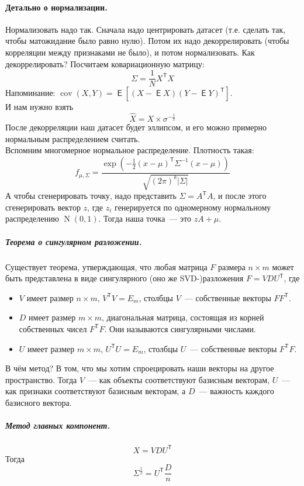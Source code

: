 \documentclass{article}
\DeclareMathOperator{\Expected}{\mathsf{E}}
\begin{document}
    \paragraph{Детально о нормализации.}
    Нормализовать надо так. Сначала надо центрировать датасет (т.е. сделать так, чтобы матожидание было равно нулю). Потом их надо декоррелировать (чтобы корреляции между признаками не было), и потом нормализовать. Как декоррелировать? Посчитаем ковариационную матрицу:
    \[
    \Sigma=\frac1NX^{\mathsf T}X
    \]
    Напоминание: $\operatorname{cov}(X,Y)=\Expected[(X-\Expected X)(Y-\Expected Y)^{\mathsf T}]$.\\
    И нам нужно взять
    \[
    \widehat X=X\times\sigma^{-\frac12}
    \]
    После декорреляции наш датасет будет эллипсом, и его можно примерно нормальным распределением считать.\\
    Вспомним многомерное нормальное распределение. Плотность такая:
    \[
    f_{\mu,\Sigma}=\frac{\exp\left(-\frac12(x-\mu)^{\mathsf T}\Sigma^{-1}(x-\mu)\right)}{\sqrt{(2\pi)^k|\Sigma|}}
    \]
    А чтобы сгенерировать точку, надо представить $\Sigma=A^{\mathsf T}A$, и после этого сгенерировать вектор $z$, где $z_i$ генерируется по одномерному нормальному распределению $\operatorname{N}(0,1)$. Тогда наша точка~--- это $zA+\mu$.
    \subparagraph{Теорема о сингулярном разложении.}
    Существует теорема, утверждающая, что любая матрица $F$ размера $n\times m$ может быть представлена в виде сингулярного (оно же SVD-)разложения $F=VDU^{\mathsf T}$, где
    \begin{itemize}
        \item $V$ имеет размер $n\times m$, $V^{\mathsf T}V=E_m$, столбцы $V$~--- собственные векторы $FF^{\mathsf T}$.
        \item $D$ имеет размер $m\times m$, диагональная матрица, состоящая из корней собственных чисел $F^{\mathsf T}F$. Они называются сингулярными числами.
        \item $U$ имеет размер $m\times m$, $U^{\mathsf T}U=E_m$, столбцы $U$~--- собственные векторы $F^{\mathsf T}F$.
    \end{itemize}
    В чём метод? В том, что мы хотим спроецировать наши векторы на другое пространство. Тогда $V$~--- как объекты соответствуют базисным векторам, $U$~--- как признаки соответствуют базисным векторам, а $D$~--- важность каждого базисного вектора.
    \subparagraph{Метод главных компонент.}
    \[
    X=VDU^{\mathsf T}
    \]
    Тогда
    \[
    \Sigma^{\frac12}=U^{\mathsf T}\frac Dn
    \]
\end{document}

